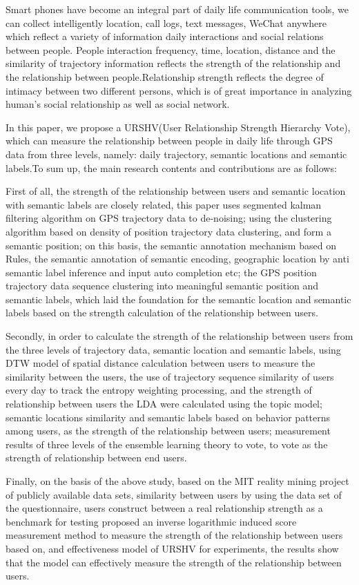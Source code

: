 \begin{eabstract}
Smart phones have become an integral part of daily life communication tools, we can collect intelligently location, call logs, text messages, WeChat anywhere which reflect a variety of information daily interactions and social relations between people. People interaction frequency, time, location, distance and the similarity of trajectory information reflects the strength of the relationship and the relationship between people.Relationship strength reflects the degree of intimacy between two different persons, which is of great importance in analyzing human's social relationship as well as social network.
\par In this paper, we propose a URSHV(User Relationship Strength Hierarchy Vote), which can measure the relationship between people in daily life through GPS data from three levels, namely: daily trajectory, semantic locations and semantic labels.To sum up, the main research contents and contributions are as follows:
\par First of all, the strength of the relationship between users and semantic location with semantic labels are closely related, this paper uses segmented kalman filtering algorithm on GPS trajectory data to de-noising; using the clustering algorithm based on density of position trajectory data clustering, and form a semantic position; on this basis, the semantic annotation mechanism based on Rules, the semantic annotation of semantic encoding, geographic location by anti semantic label inference and input auto completion etc; the GPS position trajectory data sequence clustering into meaningful semantic position and semantic labels, which laid the foundation for the semantic location and semantic labels based on the strength calculation of the relationship between users.
\par Secondly, in order to calculate the strength of the relationship between users from the three levels of trajectory data, semantic location and semantic labels, using DTW model of spatial distance calculation between users to measure the similarity between the users, the use of trajectory sequence similarity of users every day to track the entropy weighting processing, and the strength of relationship between users the LDA were calculated using the topic model; semantic locations similarity and semantic labels based on behavior patterns among users, as the strength of the relationship between users; measurement results of three levels of the ensemble learning theory to vote, to vote as the strength of relationship between end users.
\par Finally, on the basis of the above study, based on the MIT reality mining project of publicly available data sets, similarity between users by using the data set of the questionnaire, users construct between a real relationship strength as a benchmark for testing proposed an inverse logarithmic induced score measurement method to measure the strength of the relationship between users based on, and effectiveness model of URSHV for experiments, the results show that the model can effectively measure the strength of the relationship between users.

\end{eabstract}

